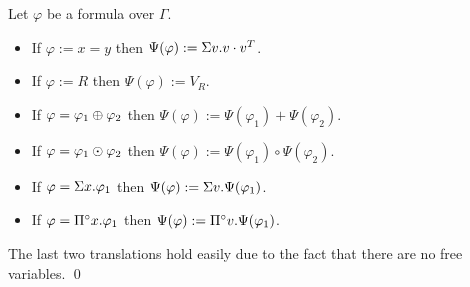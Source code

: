 Let $\varphi$ be a formula over $\Gamma$.
\begin{itemize}
  \item If $\varphi:=x=y$ then $\Psi(\varphi):= \Sigma v.v\cdot v^T$.
  \item If $\varphi:=R$ then $\Psi(\varphi):=V_R$.
  \item If $\varphi = \varphi_1 \oplus \varphi_2$ then $\Psi(\varphi):=\Psi(\varphi_1) + \Psi(\varphi_2)$.
  \item If $\varphi = \varphi_1 \odot \varphi_2$ then $\Psi(\varphi):=\Psi(\varphi_1) \circ \Psi(\varphi_2)$.
  \item If $\varphi = \Sigma x. \varphi_1$ then $\Psi(\varphi):=\Sigma v.\Psi(\varphi_1)$.
  \item If $\varphi = \Pi^{\circ} x. \varphi_1$ then $\Psi(\varphi):=\Pi^{\circ} v.\Psi(\varphi_1)$.
\end{itemize}

The last two translations hold easily due to the fact that there are no free variables.
\qed